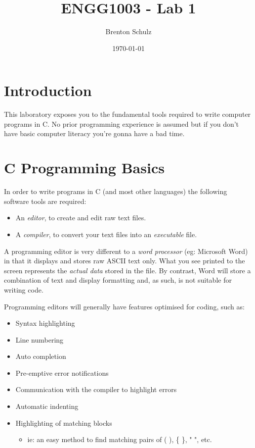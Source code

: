 \documentclass{lab}
\title{ENGG1003 - Lab 1}
\author{Brenton Schulz}
\date{\today}
\begin{document}
\maketitle

\section{Introduction}
This laboratory exposes you to the fundamental tools required to write computer programs in C. No prior programming experience is assumed but if you don't have basic computer literacy you're gonna have a bad time.

\section{C Programming Basics}
In order to write programs in C (and most other languages) the following software tools are required:

\begin{itemize}
\item An \textit{editor}, to create and edit raw text files.
\item A \textit{compiler}, to convert your text files into an \textit{executable} file.
\end{itemize}

A programming editor is very different to a \textit{word processor} (eg: Microsoft Word) in that it displays and stores raw ASCII text only. What you see printed to the screen represents the \textit{actual data} stored in the file. By contrast, Word will store a combination of text and display formatting and, as such, is not suitable for writing code.

Programming editors will generally have features optimised for coding, such as:

\begin{itemize}
\item Syntax highlighting
\item Line numbering
\item Auto completion
\item Pre-emptive error notifications
\item Communication with the compiler to highlight errors
\item Automatic indenting
\item Highlighting of matching blocks 
	\begin{itemize}
		\item ie: an easy method to find matching pairs of ( ), \{ \}, " ", etc.
	\end{itemize}
\end{itemize}
\end{document}
